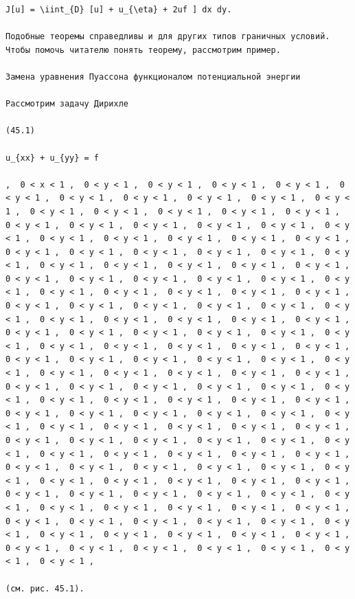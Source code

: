 \documentclass[
  ukrainian,
]{article}
\begin{document}
\begin{verbatim}
J[u] = \iint_{D} [u] + u_{\eta} + 2uf ] dx dy.

Подобные теоремы справедливы и для других типов граничных условий. Чтобы помочь читателю понять теорему, рассмотрим пример.

Замена уравнения Пуассона функционалом потенциальной энергии

Рассмотрим задачу Дирихле

(45.1)

u_{xx} + u_{yy} = f

,  0 < x < 1 ,  0 < y < 1 ,  0 < y < 1 ,  0 < y < 1 ,  0 < y < 1 ,  0 < y < 1 ,  0 < y < 1 ,  0 < y < 1 ,  0 < y < 1 ,  0 < y < 1 ,  0 < y < 1 ,  0 < y < 1 ,  0 < y < 1 ,  0 < y < 1 ,  0 < y < 1 ,  0 < y < 1 ,  0 < y < 1 ,  0 < y < 1 ,  0 < y < 1 ,  0 < y < 1 ,  0 < y < 1 ,  0 < y < 1 ,  0 < y < 1 ,  0 < y < 1 ,  0 < y < 1 ,  0 < y < 1 ,  0 < y < 1 ,  0 < y < 1 ,  0 < y < 1 ,  0 < y < 1 ,  0 < y < 1 ,  0 < y < 1 ,  0 < y < 1 ,  0 < y < 1 ,  0 < y < 1 ,  0 < y < 1 ,  0 < y < 1 ,  0 < y < 1 ,  0 < y < 1 ,  0 < y < 1 ,  0 < y < 1 ,  0 < y < 1 ,  0 < y < 1 ,  0 < y < 1 ,  0 < y < 1 ,  0 < y < 1 ,  0 < y < 1 ,  0 < y < 1 ,  0 < y < 1 ,  0 < y < 1 ,  0 < y < 1 ,  0 < y < 1 ,  0 < y < 1 ,  0 < y < 1 ,  0 < y < 1 ,  0 < y < 1 ,  0 < y < 1 ,  0 < y < 1 ,  0 < y < 1 ,  0 < y < 1 ,  0 < y < 1 ,  0 < y < 1 ,  0 < y < 1 ,  0 < y < 1 ,  0 < y < 1 ,  0 < y < 1 ,  0 < y < 1 ,  0 < y < 1 ,  0 < y < 1 ,  0 < y < 1 ,  0 < y < 1 ,  0 < y < 1 ,  0 < y < 1 ,  0 < y < 1 ,  0 < y < 1 ,  0 < y < 1 ,  0 < y < 1 ,  0 < y < 1 ,  0 < y < 1 ,  0 < y < 1 ,  0 < y < 1 ,  0 < y < 1 ,  0 < y < 1 ,  0 < y < 1 ,  0 < y < 1 ,  0 < y < 1 ,  0 < y < 1 ,  0 < y < 1 ,  0 < y < 1 ,  0 < y < 1 ,  0 < y < 1 ,  0 < y < 1 ,  0 < y < 1 ,  0 < y < 1 ,  0 < y < 1 ,  0 < y < 1 ,  0 < y < 1 ,  0 < y < 1 ,  0 < y < 1 ,  0 < y < 1 ,  0 < y < 1 ,  0 < y < 1 ,  0 < y < 1 ,  0 < y < 1 ,  0 < y < 1 ,  0 < y < 1 ,  0 < y < 1 ,  0 < y < 1 ,  0 < y < 1 ,  0 < y < 1 ,  0 < y < 1 ,  0 < y < 1 ,  0 < y < 1 ,  0 < y < 1 ,  0 < y < 1 ,  0 < y < 1 ,  0 < y < 1 ,  0 < y < 1 ,  0 < y < 1 ,  0 < y < 1 ,  0 < y < 1 ,  0 < y < 1 ,  0 < y < 1 ,  0 < y < 1 ,  0 < y < 1 ,  0 < y < 1 ,  0 < y < 1 ,  0 < y < 1 ,  0 < y < 1 ,  0 < y < 1 ,  0 < y < 1 ,  0 < y < 1 ,  0 < y < 1 ,  0 < y < 1 ,  0 < y < 1 ,  0 < y < 1 ,  0 < y < 1 ,  0 < y < 1 ,  0 < y < 1 ,  0 < y < 1 ,  0 < y < 1 ,  0 < y < 1 ,  0 < y < 1 ,  0 < y < 1 ,  0 < y < 1 ,  0 < y < 1 ,  0 < y < 1 ,  0 < y < 1 ,  0 < y < 1 ,  0 < y < 1 ,  0 < y < 1 ,  0 < y < 1 ,  0 < y < 1 ,  0 < y < 1 ,  0 < y < 1 ,

(см. рис. 45.1).


\end{verbatim}
\end{document}
